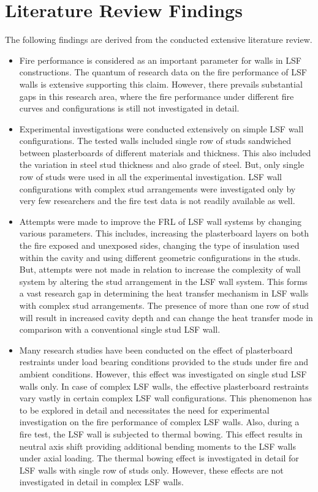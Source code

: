 \section{Literature Review Findings}
The following findings are derived from the conducted extensive literature review.
\begin{itemize}
	\item Fire performance is considered as an important parameter for walls in LSF constructions. The quantum of research data on the fire performance of LSF walls is extensive supporting this claim. However, there prevails substantial gaps in this research area, where the fire performance under different fire curves and configurations is still not investigated in detail. 
	\item Experimental investigations were conducted extensively on simple LSF wall configurations. The tested walls included single row of studs sandwiched between plasterboards of different materials and thickness. This also included the variation in steel stud thickness and also grade of steel. But, only single row of studs were used in all the experimental investigation. LSF wall configurations with complex stud arrangements were investigated only by very few researchers and the fire test data is not readily available as well.
	\item Attempts were made to improve the FRL of LSF wall systems by changing various parameters. This includes, increasing the plasterboard layers on both the fire exposed and unexposed sides, changing the type of insulation used within the cavity and using different geometric configurations in the studs. But, attempts were not made in relation to increase the complexity of wall system by altering the stud arrangement in the LSF wall system. This forms a vast research gap in determining the heat transfer mechanism in LSF walls with complex stud arrangements. The presence of more than one row of stud will result in increased cavity depth and can change the heat transfer mode in comparison with a conventional single stud LSF wall.
	\item Many research studies have been conducted on the effect of plasterboard restraints under load bearing conditions provided to the studs under fire and ambient conditions. However, this effect was investigated on single stud LSF walls only. In case of complex LSF walls, the effective plasterboard restraints vary vastly in certain complex LSF wall configurations. This phenomenon has to be explored in detail and necessitates the need for experimental investigation on the fire performance of complex LSF walls. Also, during a fire test, the LSF wall is subjected to thermal bowing. This effect results in neutral axis shift providing additional bending moments to the LSF walls under axial loading. The thermal bowing effect is investigated in detail for LSF walls with single row of studs only. However, these effects are not investigated in detail in complex LSF walls.    

\end{itemize}

